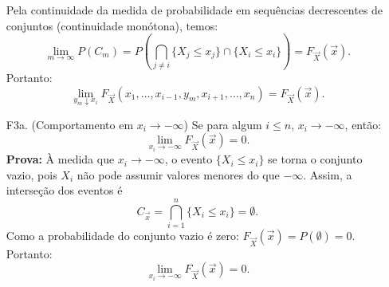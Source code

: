 \begin{frame}
	\begin{block}{}
		\begin{enumerate}		
			
			\item[] Pela continuidade da medida de probabilidade em sequências decrescentes de conjuntos (continuidade monótona), temos:
\[
			\lim_{m \to \infty} P(C_m) = P\left( \bigcap_{j \neq i} \{ X_j \leq x_j \} \cap \{ X_i \leq x_i \} \right) = F_{\vec{X}}(\vec{x}).
			\]
			Portanto:
			\[
			\lim_{y_m \downarrow x_i} F_{\vec{X}}(x_1, \dots, x_{i-1}, y_m, x_{i+1}, \dots, x_n) = F_{\vec{X}}(\vec{x}).
			\]
	\item[F3a.](Comportamento em \( x_i \to -\infty \))  Se para algum \( i \leq n \), \( x_i \to -\infty \), então:
		\[
	\lim_{x_i \to -\infty} F_{\vec{X}}(\vec{x}) = 0.
	\]
		\medskip
	{\bf Prova:} À medida que \( x_i \to -\infty \), o evento \( \{ X_i \leq x_i \} \) se torna o conjunto vazio, pois \( X_i \) não pode assumir valores menores do que \( -\infty \). Assim, a interseção dos eventos é
	\[
	C_{\vec{x}} = \bigcap_{i=1}^{n} \{ X_i \leq x_i \} = \emptyset.
	\]
	Como a probabilidade do conjunto vazio é zero:
	$
	F_{\vec{X}}(\vec{x}) = P(\emptyset) = 0.
	$ Portanto:
		\[
	\lim_{x_i \to -\infty} F_{\vec{X}}(\vec{x}) = 0.
	\]
	\end{enumerate}
\end{block}

\end{frame}	




